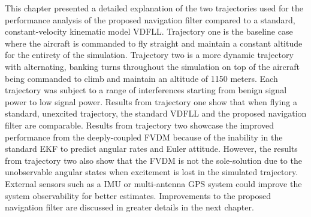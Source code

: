 This chapter presented a detailed explanation of the two trajectories used for the performance analysis of the proposed navigation filter compared to a standard, constant-velocity kinematic model VDFLL\@. Trajectory one is the baseline case where the aircraft is commanded to fly straight and maintain a constant altitude for the entirety of the simulation. Trajectory two is a more dynamic trajectory with alternating, banking turns throughout the simulation on top of the aircraft being commanded to climb and maintain an altitude of 1150 meters. Each trajectory was subject to a range of interferences starting from benign signal power to low signal power. Results from trajectory one show that when flying a standard, unexcited trajectory, the standard VDFLL and the proposed navigation filter are comparable. Results from trajectory two showcase the improved performance from the deeply-coupled FVDM because of the inability in the standard EKF to predict angular rates and Euler attitude. However, the results from trajectory two also show that the FVDM is not the sole-solution due to the unobservable angular states when excitement is lost in the simulated trajectory. External sensors such as a IMU or multi-antenna GPS system could improve the system observability for better estimates. Improvements to the proposed navigation filter are discussed in greater details in the next chapter.